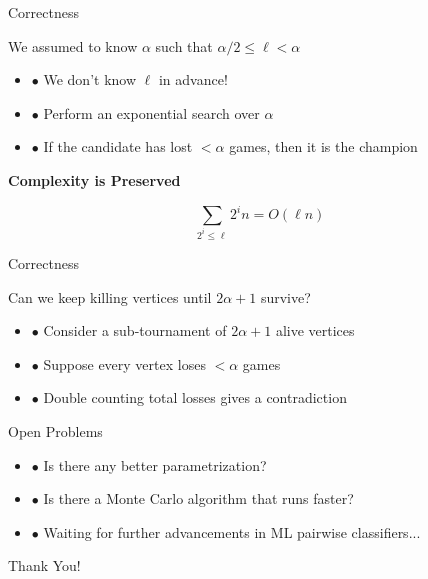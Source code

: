 \documentclass{beamer}
\begin{document}
\begin{frame}{Correctness}
  \begin{block}{We assumed to know $\alpha$ such that $\alpha / 2 \leq \ell < \alpha$}
    
    \begin{itemize}
    \item $\bullet$ We don't know $\ell$ in advance!
    \item $\bullet$ Perform an exponential search over $\alpha$
    \item $\bullet$ If the candidate has lost $< \alpha$ games, then it is the champion
    \end{itemize}
  \end{block}

  \center\textbf{Complexity is Preserved}

    $$\sum_{2^i \leq \ell} 2^i n = O\left(\ell n\right)$$
\end{frame}

\begin{frame}{Correctness}
  \begin{block}{Can we keep killing vertices until $2\alpha + 1$ survive?}
    \vspace{.4cm}
    \begin{itemize}
    \item $\bullet$ Consider a sub-tournament of $2\alpha + 1$ alive vertices
    \item $\bullet$ Suppose every vertex loses $< \alpha$ games
    \item $\bullet$ Double counting total losses gives a contradiction
    \end{itemize}
    
  \end{block}
\end{frame}

\begin{frame}{Open Problems}
  \begin{itemize}
  \item $\bullet$ Is there any better parametrization?
    \vspace{4mm}
  \item $\bullet$ Is there a Monte Carlo algorithm that runs faster?
    \vspace{4mm}
  \item $\bullet$ Waiting for further advancements in ML pairwise classifiers...
  \end{itemize}
  \vspace{4mm}
  \begin{center}
    \Huge{Thank You!}
  \end{center}

\end{frame}
\end{document}
